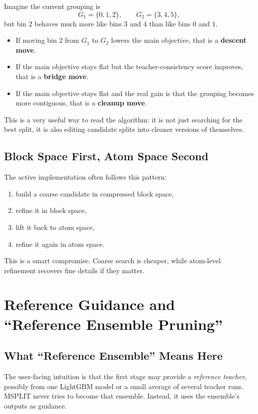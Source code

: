 \documentclass[11pt]{article}
\begin{document}
Imagine the current grouping is
\[
G_1 = \{0,1,2\}, \qquad G_2 = \{3,4,5\},
\]
but bin \(2\) behaves much more like bins \(3\) and \(4\) than like bins \(0\) and \(1\).

\begin{itemize}
\item If moving bin \(2\) from \(G_1\) to \(G_2\) lowers the main objective, that is a \textbf{descent move}.
\item If the main objective stays flat but the teacher-consistency score improves, that is a \textbf{bridge move}.
\item If the main objective stays flat and the real gain is that the grouping becomes more contiguous, that is a \textbf{cleanup move}.
\end{itemize}

This is a very useful way to read the algorithm: it is not just searching for the best split, it is also editing candidate splits into cleaner versions of themselves.

\subsection{Block Space First, Atom Space Second}

The active implementation often follows this pattern:

\begin{enumerate}
\item build a coarse candidate in compressed block space,
\item refine it in block space,
\item lift it back to atom space,
\item refine it again in atom space.
\end{enumerate}

This is a smart compromise. Coarse search is cheaper, while atom-level refinement recovers fine details if they matter.

\section{Reference Guidance and ``Reference Ensemble Pruning''}

\subsection{What ``Reference Ensemble'' Means Here}

The user-facing intuition is that the first stage may provide a \emph{reference teacher}, possibly from one LightGBM model or a small average of several teacher runs. MSPLIT never tries to become that ensemble. Instead, it uses the ensemble's outputs as guidance.
\end{document}
